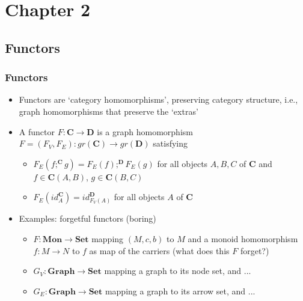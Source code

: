 \documentclass[handout]{beamer}
\newcommand{\bfsf}[1]{{\boldsymbol{#1}}}
\newcommand{\Set}{\bfsf{Set}}
\newcommand{\Gra}{\bfsf{Graph}}
\newcommand{\CC}{\bfsf{C}}
\newcommand{\DD}{\bfsf{D}}
\newcommand{\Mon}{\bfsf{Mon}}
\begin{document}
\section{Chapter 2}
\subsection{Functors}

\frame
  {   
    \frametitle{Functors}\label{Ch2:Functors}

 \begin{itemize}[<+->]
\item Functors are `category homomorphisms', preserving category structure,
i.e., graph homomorphisms that preserve the `extras'
\item A functor $F: \CC\to\DD$ is a graph homomorphism 
$F=(F_V,F_E): gr(\CC)\to gr(\DD)$ satisfying
   \begin{itemize}[<+->]
\item $F_E(f;^\CC g) = F_E(f);^\DD F_E(g)$ for all objects $A,B,C$ of $\CC$ 
and $f\in\CC(A,B)$, $g\in\CC(B,C)$
\item $F_E(id^\CC_A) = id^\DD_{F_V(A)}$ for all objects $A$ of $\CC$ 
   \end{itemize}
\item Examples: forgetful functors (boring) %
   \begin{itemize}[<+->]
\item $F: \Mon \to \Set$ mapping $(M,c,b)$ to $M$ and a monoid homomorphism
$f: M\to N$ to $f$ as map of the carriers (what does this $F$ forget?)
\item  $G_V: \Gra \to \Set$ mapping a graph to its node set, and ...
\item  $G_E: \Gra \to \Set$ mapping a graph to its arrow set, and ...
   \end{itemize}
 \end{itemize}

 }
\end{document}
